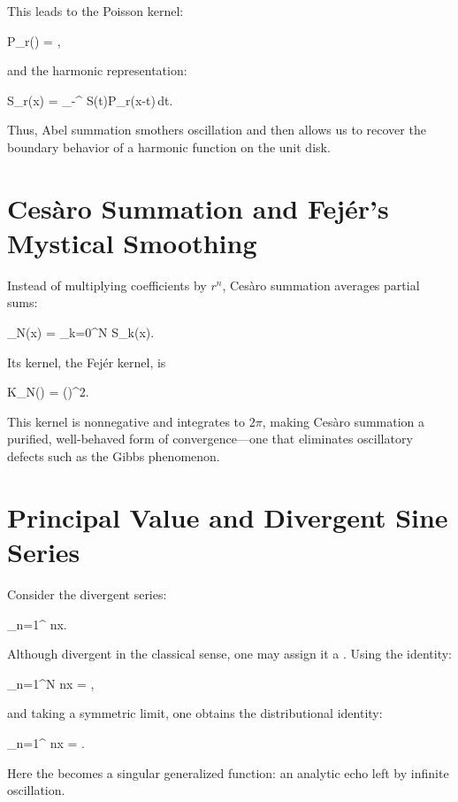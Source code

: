 This leads to the Poisson kernel:

\startformula
P_r(\theta) = ,
\stopformula

and the harmonic representation:

\startformula
S_r(x) =  \int_{-\pi}^{\pi} S(t)P_r(x-t)\,dt.
\stopformula

Thus, Abel summation smothers oscillation and then allows us to recover
the boundary behavior of a harmonic function on the unit disk.

\section{Cesàro Summation and Fejér's Mystical Smoothing}

Instead of multiplying coefficients by $r^n$, Cesàro summation averages
partial sums:

\startformula
\sigma_N(x) = \sum_{k=0}^{N} S_k(x).
\stopformula

Its kernel, the Fejér kernel, is

\startformula
K_N(\theta) = 
\left(\right)^2.
\stopformula

This kernel is nonnegative and integrates to $2\pi$, making
Cesàro summation a purified, well-behaved form of convergence—one that
eliminates oscillatory defects such as the Gibbs phenomenon.

\section{Principal Value and Divergent Sine Series}

Consider the divergent series:

\startformula
\sum_{n=1}^{\infty} \sin nx.
\stopformula

Although divergent in the classical sense, one may assign it a
. Using the identity:

\startformula
\sum_{n=1}^{N} \sin nx =
,
\stopformula

and taking a symmetric limit, one obtains the distributional identity:

\startformula
\sum_{n=1}^{\infty} \sin nx = \cot{}.
\stopformula

Here the  becomes a singular generalized function: an
analytic echo left by infinite oscillation.

